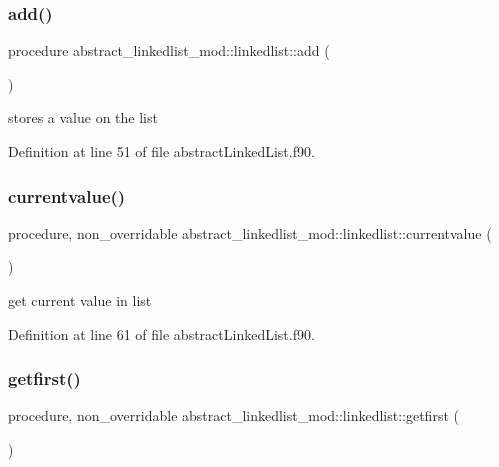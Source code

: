 \subsubsection{\texorpdfstring{add()}{add()}}
{\footnotesize\ttfamily procedure abstract\+\_\+linkedlist\+\_\+mod\+::linkedlist\+::add (\begin{DoxyParamCaption}{ }\end{DoxyParamCaption})\hspace{0.3cm}{\ttfamily [private]}}



stores a value on the list 



Definition at line 51 of file abstract\+Linked\+List.\+f90.

\mbox{\label{structabstract__linkedlist__mod_1_1linkedlist_a01dda56c3e79f6e9f5b12df9a9ec192b}} 
\subsubsection{\texorpdfstring{currentvalue()}{currentvalue()}}
{\footnotesize\ttfamily procedure, non\+\_\+overridable abstract\+\_\+linkedlist\+\_\+mod\+::linkedlist\+::currentvalue (\begin{DoxyParamCaption}{ }\end{DoxyParamCaption})\hspace{0.3cm}{\ttfamily [private]}}



get current value in list 



Definition at line 61 of file abstract\+Linked\+List.\+f90.

\mbox{\label{structabstract__linkedlist__mod_1_1linkedlist_ae96f8c00f41925064249e443ce31f44a}} 
\subsubsection{\texorpdfstring{getfirst()}{getfirst()}}
{\footnotesize\ttfamily procedure, non\+\_\+overridable abstract\+\_\+linkedlist\+\_\+mod\+::linkedlist\+::getfirst (\begin{DoxyParamCaption}{ }\end{DoxyParamCaption})\hspace{0.3cm}{\ttfamily [private]}}



